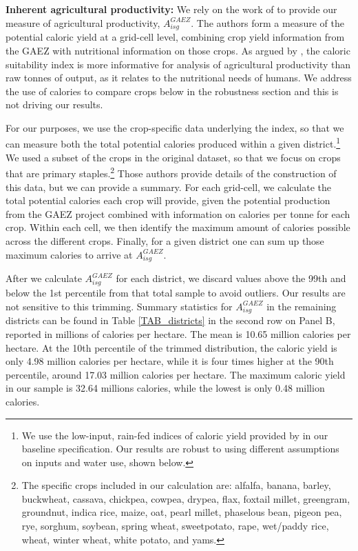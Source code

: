 \documentclass[11pt]{article}
\begin{document}
\vspace{.5cm}\noindent\textbf{Inherent agricultural productivity:} We rely on the work of \citet{galorozak2016} to provide our measure of agricultural productivity, $A^{GAEZ}_{isg}$. The authors form a measure of the potential caloric yield at a grid-cell level, combining crop yield information from the GAEZ with nutritional information on those crops. As argued by \citet{galorozak2016}, the caloric suitability index is more informative for analysis of agricultural productivity than raw tonnes of output, as it relates to the nutritional needs of humans. We address the use of calories to compare crops below in the robustness section and this is not driving our results.

For our purposes, we use the crop-specific data underlying the \citet{galorozak2016} index, so that we can measure both the total potential calories produced within a given district.\footnote{We use the low-input, rain-fed indices of caloric yield provided by \citet{galorozak2016} in our baseline specification. Our results are robust to using different assumptions on inputs and water use, shown below.} We used a subset of the crops in the original \citet{galorozak2016} dataset, so that we focus on crops that are primary staples.\footnote{The specific crops included in our calculation are: alfalfa, banana, barley, buckwheat, cassava, chickpea, cowpea, drypea, flax, foxtail millet, greengram, groundnut, indica rice, maize, oat, pearl millet, phaselous bean, pigeon pea, rye, sorghum, soybean, spring wheat, sweetpotato, rape, wet/paddy rice, wheat, winter wheat, white potato, and yams.} Those authors provide details of the construction of this data, but we can provide a summary. For each grid-cell, we calculate the total potential calories each crop will provide, given the potential production from the GAEZ project \citep{gaez} combined with information on calories per tonne for each crop. Within each cell, we then identify the maximum amount of calories possible across the different crops. Finally, for a given district one can sum up those maximum calories to arrive at $A^{GAEZ}_{isg}$.

After we calculate $A^{GAEZ}_{isg}$ for each district, we discard values above the 99th and below the 1st percentile from that total sample to avoid outliers. Our results are not sensitive to this trimming. Summary statistics for $A^{GAEZ}_{isg}$ in the remaining districts can be found in Table \ref{TAB_districts} in the second row on Panel B, reported in millions of calories per hectare. The mean is 10.65 million calories per hectare. At the 10th percentile of the trimmed distribution, the caloric yield is only 4.98 million calories per hectare, while it is four times higher at the 90th percentile, around 17.03 million calories per hectare. The maximum caloric yield in our sample is 32.64 millions calories, while the lowest is only 0.48 million calories. 
\end{document}
